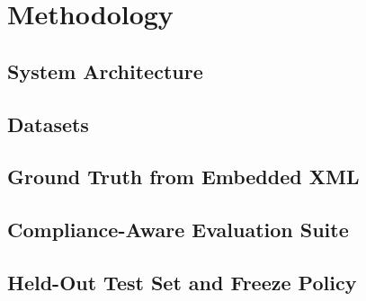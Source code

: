\chapter{Methodology}
\label{ch:methodology}


\section{System Architecture}
\label{sec:method-architecture}


\section{Datasets}
\label{sec:method-data}


\section{Ground Truth from Embedded XML}
\label{sec:method-gt}


\section{Compliance-Aware Evaluation Suite}
\label{sec:method-metrics}


\section{Held-Out Test Set and Freeze Policy}
\label{sec:method-heldout}

